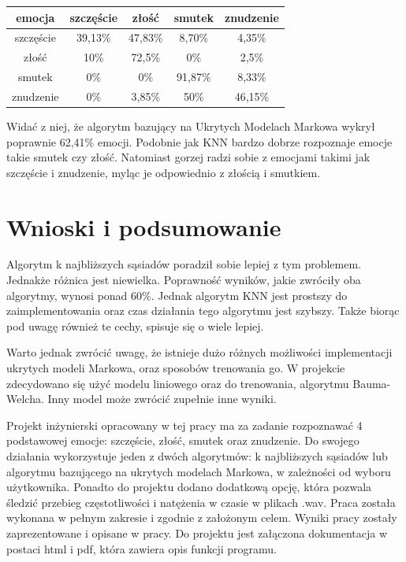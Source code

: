 \documentclass[declaration,shortabstract]{iithesis}
\begin{document}
\begin{center}
  \begin{tabular}{| c | c | c | c | c |}
    \hline
    emocja & szczęście & złość & smutek & znudzenie \\ \hline
    szczęście & 39,13\% & 47,83\% & 8,70\% & 4,35\% \\ \hline
	złość & 10\% & 72,5\% & 0\% & 2,5\% \\ \hline
	smutek & 0\% & 0\% & 91,87\% & 8,33\% \\ \hline
	znudzenie & 0\% & 3,85\% & 50\% & 46,15\% \\
    \hline
  \end{tabular}
\end{center}

Widać z niej, że algorytm bazujący na Ukrytych Modelach Markowa wykrył poprawnie 62,41\% emocji. Podobnie jak KNN bardzo dobrze rozpoznaje emocje takie smutek czy złość. Natomiast gorzej radzi sobie z emocjami takimi jak szczęście i znudzenie, myląc je odpowiednio z złością i smutkiem.


\chapter{Wnioski i podsumowanie}

Algorytm k najbliższych sąsiadów poradził sobie lepiej z tym problemem. Jednakże różnica jest niewielka. Poprawność wyników, jakie zwróciły oba algorytmy, wynosi ponad 60\%. Jednak algorytm KNN jest prostszy do zaimplementowania oraz czas działania tego algorytmu jest szybszy. Także biorąc pod uwagę również te cechy, spisuje się o wiele lepiej.

Warto jednak zwrócić uwagę, że istnieje dużo różnych możliwości implementacji ukrytych modeli Markowa, oraz sposobów trenowania go. W projekcie zdecydowano się użyć modelu liniowego oraz do trenowania, algorytmu Bauma-Welcha. Inny model może zwrócić zupełnie inne wyniki.

Projekt inżynierski opracowany w tej pracy ma za zadanie rozpoznawać 4 podstawowej emocje: szczęście, złość, smutek oraz znudzenie. Do swojego działania wykorzystuje jeden z dwóch algorytmów: k najbliższych sąsiadów lub algorytmu bazującego na ukrytych modelach Markowa, w zależności od wyboru użytkownika. Ponadto do projektu dodano dodatkową opcję, która pozwala śledzić przebieg częstotliwości i natężenia w czasie w plikach .wav. Praca została wykonana w pełnym zakresie i zgodnie z założonym celem. Wyniki pracy zostały zaprezentowane i opisane w pracy. Do projektu jest załączona dokumentacja w postaci html i pdf, która zawiera opis funkcji programu.
\end{document}
